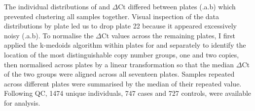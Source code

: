 The individual distributions of  and  $\Delta$Ct differed between plates (.a.b) which prevented clustering all samples together.
Visual inspection of the data distributions by plate led us to drop plate 22 because it appeared excessively noisy (.a.b).
To normalise the $\Delta$Ct values across the remaining plates, I first applied the k-medoids algorithm within plates for  and  separately
to identify the location of the most distinguishable copy number groups, one and two copies, then normalised across plates by a linear transformation so that the median $\Delta$Ct of the two groups were aligned across all seventeen plates.
Samples repeated across different plates were summarised by the median of their repeated value.
Following QC, 1474 unique individuals, 747 cases and 727 controls, were available for analysis.


